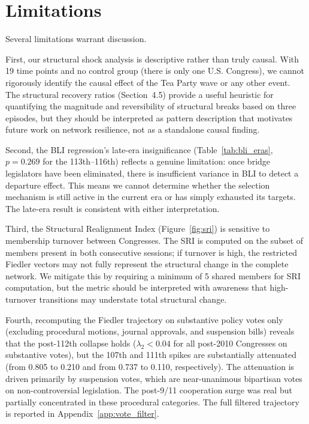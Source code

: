 \documentclass[12pt, a4paper]{article}
\begin{document}
\section{Limitations}

Several limitations warrant discussion.

First, our structural shock analysis is descriptive rather than truly causal. With 19 time points and no control group (there is only one U.S. Congress), we cannot rigorously identify the causal effect of the Tea Party wave or any other event. The structural recovery ratios (Section~4.5) provide a useful heuristic for quantifying the magnitude and reversibility of structural breaks based on three episodes, but they should be interpreted as pattern description that motivates future work on network resilience, not as a standalone causal finding.

Second, the BLI regression's late-era insignificance (Table~\ref{tab:bli_eras}, $p = 0.269$ for the 113th--116th) reflects a genuine limitation: once bridge legislators have been eliminated, there is insufficient variance in BLI to detect a departure effect. This means we cannot determine whether the selection mechanism is still active in the current era or has simply exhausted its targets. The late-era result is consistent with either interpretation.

Third, the Structural Realignment Index (Figure~\ref{fig:sri}) is sensitive to membership turnover between Congresses. The SRI is computed on the subset of members present in both consecutive sessions; if turnover is high, the restricted Fiedler vectors may not fully represent the structural change in the complete network. We mitigate this by requiring a minimum of 5 shared members for SRI computation, but the metric should be interpreted with awareness that high-turnover transitions may understate total structural change.

Fourth, recomputing the Fiedler trajectory on substantive policy votes only (excluding procedural motions, journal approvals, and suspension bills) reveals that the post-112th collapse holds ($\lambda_2 < 0.04$ for all post-2010 Congresses on substantive votes), but the 107th and 111th spikes are substantially attenuated (from 0.805 to 0.210 and from 0.737 to 0.110, respectively). The attenuation is driven primarily by suspension votes, which are near-unanimous bipartisan votes on non-controversial legislation. The post-9/11 cooperation surge was real but partially concentrated in these procedural categories. The full filtered trajectory is reported in Appendix~\ref{app:vote_filter}.
\end{document}
